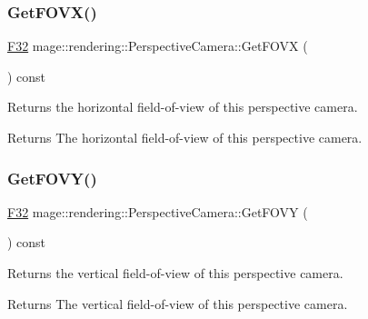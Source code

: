 \hypertarget{classmage_1_1rendering_1_1_perspective_camera_a3308ee4d7ec6830c04ed3f4fc01f81ac}{}\label{classmage_1_1rendering_1_1_perspective_camera_a3308ee4d7ec6830c04ed3f4fc01f81ac} 
\subsubsection{\texorpdfstring{Get\+F\+O\+V\+X()}{GetFOVX()}}
{\footnotesize\ttfamily \hyperlink{namespacemage_aa97e833b45f06d60a0a9c4fc22ae02c0}{F32} mage\+::rendering\+::\+Perspective\+Camera\+::\+Get\+F\+O\+VX (\begin{DoxyParamCaption}{ }\end{DoxyParamCaption}) const\hspace{0.3cm}{\ttfamily [noexcept]}}

Returns the horizontal field-\/of-\/view of this perspective camera.

\begin{DoxyReturn}{Returns}
The horizontal field-\/of-\/view of this perspective camera. 
\end{DoxyReturn}
\hypertarget{classmage_1_1rendering_1_1_perspective_camera_ae6be4458a427e626ec7299c5898ffd38}{}\label{classmage_1_1rendering_1_1_perspective_camera_ae6be4458a427e626ec7299c5898ffd38} 
\subsubsection{\texorpdfstring{Get\+F\+O\+V\+Y()}{GetFOVY()}}
{\footnotesize\ttfamily \hyperlink{namespacemage_aa97e833b45f06d60a0a9c4fc22ae02c0}{F32} mage\+::rendering\+::\+Perspective\+Camera\+::\+Get\+F\+O\+VY (\begin{DoxyParamCaption}{ }\end{DoxyParamCaption}) const\hspace{0.3cm}{\ttfamily [noexcept]}}

Returns the vertical field-\/of-\/view of this perspective camera.

\begin{DoxyReturn}{Returns}
The vertical field-\/of-\/view of this perspective camera. 
\end{DoxyReturn}
\hypertarget{classmage_1_1rendering_1_1_perspective_camera_af049c6330ebdaa822bfd31dc88f25ac2}{}\label{classmage_1_1rendering_1_1_perspective_camera_af049c6330ebdaa822bfd31dc88f25ac2} 
